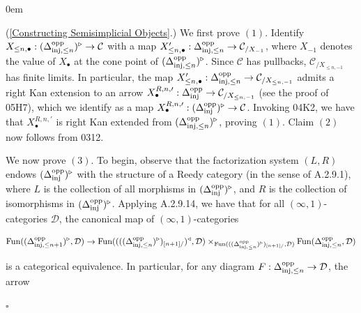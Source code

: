 \documentclass[10pt]{article}
\newcommand{\C}{\mathcal C}
\newcommand{\cD}{\mathcal{D}}
\renewcommand{\qed}{\hfill$\square$}
\renewenvironment{proof}{\begin{addmargin}[1em]{0em}\begin{newproof}}{\end{newproof}\end{addmargin}\qed}
\theoremstyle{witharg}
\theoremstyle{witharg}
\theoremstyle{witharg2}
\begin{document}
\begin{proof} (\ref{Constructing Semisimplicial Objects}.) We first prove $(1)$. Identify $X_{\leq n,\bullet}:(\Delta^{\textnormal{opp}}_{\textnormal{inj},\leq n})^\triangleright\rightarrow \C$ with a map $X_{\leq n,\bullet}^\prime:\Delta^{\textnormal{opp}}_{\textnormal{inj},\leq n}\rightarrow \C_{/X_{-1}}$, where $X_{-1}$ denotes the value of $X_{\bullet}$ at the cone point of $(\Delta^{\textnormal{opp}}_{\textnormal{inj},\leq n})^\triangleright$. Since $\C$ has pullbacks, $\C_{/X_{\leq n,-1}}$ has finite limits. In particular, the map $X_{\leq n,\bullet}^\prime:\Delta^{\textnormal{opp}}_{\textnormal{inj},\leq n}\rightarrow \C_{/X_{\leq n,-1}}$ admits a right Kan extension to an arrow $X_{\bullet}^{R,n,\prime}:\Delta^{\textnormal{opp}}_{\textnormal{inj}}\rightarrow \C_{/X_{\leq n,-1}}$ (see the proof of  05H7), which we identify as a map $X_{\bullet}^{R,n,\prime}:(\Delta^{\textnormal{opp}}_{\textnormal{inj}})^\triangleright\rightarrow \C$. Invoking  04K2, we have that $X_{\bullet}^{R,n,\prime}$ is right Kan extended from $(\Delta^{\textnormal{opp}}_{\textnormal{inj},\leq n})^\triangleright$, proving $(1)$. Claim $(2)$ now follows from  0312. 


    We now prove $(3)$. To begin, observe that the factorization system $(L,R)$ endows $(\Delta^{\textnormal{opp}}_{\textnormal{inj}})^\triangleright$ with the structure of a Reedy category (in the sense of  A.2.9.1), where $L$ is the collection of all morphisms in $(\Delta^{\textnormal{opp}}_{\textnormal{inj}})^\triangleright$, and $R$ is the collection of isomorphisms in $(\Delta^{\textnormal{opp}}_{\textnormal{inj}})^\triangleright$. Applying  A.2.9.14, we have that for all $(\infty,1)$-categories $\cD$, the canonical map of $(\infty,1)$-categories

    $$\textnormal{Fun}((\Delta^{\textnormal{opp}}_{\textnormal{inj},\leq n+1})^\triangleright,\cD)\rightarrow \textnormal{Fun}((((\Delta^{\textnormal{opp}}_{\textnormal{inj},\leq n})^\triangleright)_{[n+1]/})^\triangleleft,\cD)\times_{\textnormal{Fun}(((\Delta^{\textnormal{opp}}_{\textnormal{inj},\leq n})^\triangleright)_{[n+1]/},\cD)}\textnormal{Fun}(\Delta^{\textnormal{opp}}_{\textnormal{inj},\leq n},\cD)$$

    \noindent is a categorical equivalence. In particular, for any diagram $F:\Delta^{\textnormal{opp}}_{\textnormal{inj},\leq n}\rightarrow \cD$, the arrow 


\end{proof}
\end{document}
